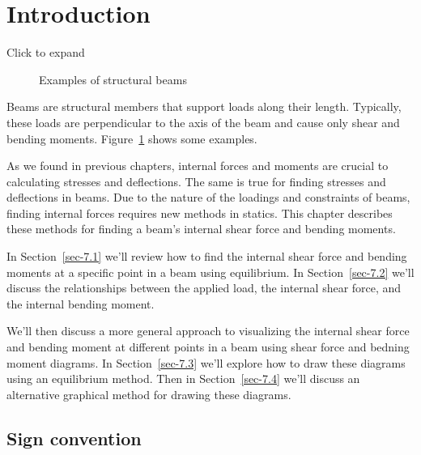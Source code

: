 \documentclass[
  letterpaper,
  DIV=11,
  numbers=noendperiod]{scrreprt}
\theoremstyle{definition}
\theoremstyle{remark}
\begin{document}
\section*{Introduction}\label{introduction-6}


Click to expand

\begin{figure}


\caption{\label{fig-7.1}Examples of structural beams}

\end{figure}%

Beams are structural members that support loads along their length.
Typically, these loads are perpendicular to the axis of the beam and
cause only shear and bending moments. Figure~\ref{fig-7.1} shows some
examples.

As we found in previous chapters, internal forces and moments are
crucial to calculating stresses and deflections. The same is true for
finding stresses and deflections in beams. Due to the nature of the
loadings and constraints of beams, finding internal forces requires new
methods in statics. This chapter describes these methods for finding a
beam's internal shear force and bending moments.

In Section~\ref{sec-7.1} we'll review how to find the internal shear
force and bending moments at a specific point in a beam using
equilibrium. In Section~\ref{sec-7.2} we'll discuss the relationships
between the applied load, the internal shear force, and the internal
bending moment.

We'll then discuss a more general approach to visualizing the internal
shear force and bending moment at different points in a beam using shear
force and bedning moment diagrams. In Section~\ref{sec-7.3} we'll
explore how to draw these diagrams using an equilibrium method. Then in
Section~\ref{sec-7.4} we'll discuss an alternative graphical method for
drawing these diagrams.

\subsection*{Sign convention}\label{sign-convention}
\end{document}
